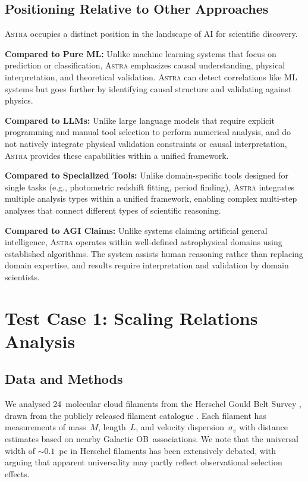 \documentclass[fleqn,usenatbib]{mnras}
\newcommand{\astra}{\textsc{Astra}\xspace}
\begin{document}
\subsection{Positioning Relative to Other Approaches}
\label{sec:methods:positioning}

\astra occupies a distinct position in the landscape of AI for scientific discovery.

\textbf{Compared to Pure ML:}
Unlike machine learning systems that focus on prediction or classification, \astra emphasizes causal understanding, physical interpretation, and theoretical validation.
\astra can detect correlations like ML systems but goes further by identifying causal structure and validating against physics.

\textbf{Compared to LLMs:}
Unlike large language models that require explicit programming and manual tool selection to perform numerical analysis, and do not natively integrate physical validation constraints or causal interpretation, \astra provides these capabilities within a unified framework.

\textbf{Compared to Specialized Tools:}
Unlike domain-specific tools designed for single tasks (e.g., photometric redshift fitting, period finding), \astra integrates multiple analysis types within a unified framework, enabling complex multi-step analyses that connect different types of scientific reasoning.

\textbf{Compared to AGI Claims:}
Unlike systems claiming artificial general intelligence, \astra operates within well-defined astrophysical domains using established algorithms.
The system assists human reasoning rather than replacing domain expertise, and results require interpretation and validation by domain scientists.

\section{Test Case 1: Scaling Relations Analysis}
\label{sec:tc1}

\subsection{Data and Methods}
\label{sec:tc1:data}

We analysed 24~molecular cloud filaments from the Herschel Gould Belt Survey \citep[HGBS;][]{Andre2010}, drawn from the publicly released filament catalogue \citep{Arzoumanian2019}.
Each filament has measurements of mass~$M$, length~$L$, and velocity dispersion~$\sigma_v$ with distance estimates based on nearby Galactic OB~associations.
We note that the universal width of $\sim\!0.1$~pc in Herschel filaments has been extensively debated, with \citet{Panopoulou2022} arguing that apparent universality may partly reflect observational selection effects.
\end{document}

